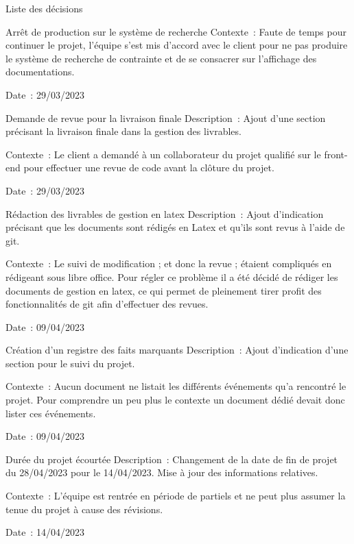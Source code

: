 \documentclass[]{article}
\begin{document}
{\begin{section}{Liste des décisions}
\begin{subsection}{Arrêt de production sur le système de recherche}
     Contexte : Faute de temps pour continuer le projet, l’équipe s’est mis d’accord avec le client pour ne pas produire le système de recherche de contrainte et de se consacrer sur l’affichage des documentations.

     Date : 29/03/2023
 \end{subsection}
 \newpage
 \begin{subsection}{Demande de revue pour la livraison finale}
     Description : Ajout d’une section précisant la livraison finale dans la gestion des livrables.

     Contexte : Le client a demandé à un collaborateur du projet qualifié sur le front-end pour effectuer une revue de code avant la clôture du projet.

     Date : 29/03/2023
 \end{subsection}

 \begin{subsection}{Rédaction des livrables de gestion en latex}
    Description : Ajout d'indication précisant que les documents sont rédigés en Latex et qu'ils sont revus à l'aide de git.

    Contexte : Le suivi de modification ; et donc la revue ; étaient compliqués en rédigeant sous libre office. Pour régler ce problème il a été décidé de rédiger les documents de gestion en latex, ce qui permet de pleinement tirer profit des fonctionnalités de git afin d'effectuer des revues.

    Date : 09/04/2023
\end{subsection}

\begin{subsection}{Création d'un registre des faits marquants}
    Description : Ajout d'indication d'une section pour le suivi du projet.

    Contexte : Aucun document ne listait les différents événements qu'a rencontré le projet. Pour comprendre un peu plus le contexte un document dédié devait donc lister ces événements.

    Date : 09/04/2023
\end{subsection}

\begin{subsection}{Durée du projet écourtée}
    Description : Changement de la date de fin de projet du 28/04/2023 pour le 14/04/2023. Mise à jour des informations relatives.

    Contexte : L'équipe est rentrée en période de partiels et ne peut plus assumer la tenue du projet à cause des révisions.

    Date : 14/04/2023
\end{subsection}
\end{section}
}
\end{document}
